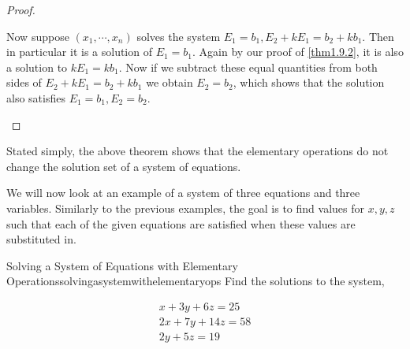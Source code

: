 \begin{proof}
\begin{enumerate}
Now suppose $\left( x_{1},\cdots ,x_{n}\right)$  solves the system 
$E_{1}=b_{1}, E_{2}+kE_{1}=b_{2}+kb_{1}$. Then in particular it is a solution of $E_{1} = b_{1}$. Again by our proof of \ref{thm1.9.2},
 it is also a solution to $kE_{1}=kb_{1}$. Now if we subtract these equal quantities from both sides of 
$E_{2}+kE_{1}=b_{2}+kb_{1}$ we obtain $E_{2}=b_{2}$, which shows that the solution also satisfies
$E_{1}=b_{1},E_{2}=b_{2}.$ 
\end{enumerate}
\end{proof}
\fi
Stated simply, the above theorem shows that the elementary operations do not
change the solution set of a system of equations.

We will now look at an example of a system of three equations and three variables.
Similarly to the previous examples, the goal is to find values for $x,y,z$ such that each of the given equations
are satisfied when these values are substituted in.

\begin{example}{ Solving a System of Equations with Elementary Operations}{solvingasystemwithelementaryops}
Find the solutions to the system,

\begin{equation}
\begin{array}{c}
x+3y+6z=25 \\
2x+7y+14z=58 \\
2y+5z=19
\end{array}
\label{solvingasystem1}
\end{equation}
\end{example}

